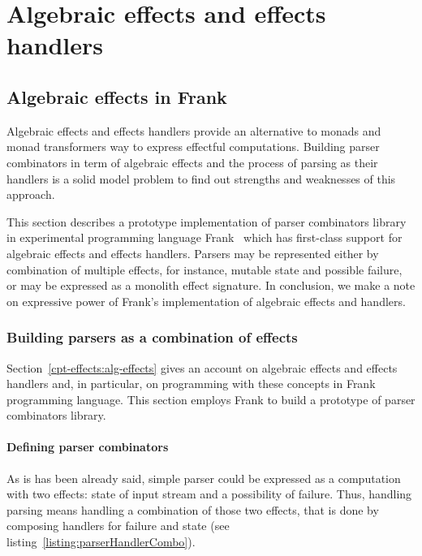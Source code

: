 \chapter{Algebraic effects and effects handlers}
\label{cpt-alg-eff}

  \section{Algebraic effects in Frank}
  \label{cpt-alg-eff:frank}

  Algebraic effects and effects handlers provide an alternative to monads and monad
  transformers way to express effectful computations. Building parser combinators in
  term of algebraic effects and the process of parsing as their handlers is a solid
  model problem to find out strengths and weaknesses of this approach.

  This section describes a prototype implementation of parser
  combinators library in experimental programming language
  Frank~\cite{DBLP:conf/popl/LindleyMM17} which has first-class support for
  algebraic effects and effects handlers. Parsers may be represented either by
  combination of multiple effects, for instance, mutable state and possible failure,
  or may be expressed as a monolith effect signature. In conclusion, we make a
  note on expressive power of Frank's implementation of algebraic effects and
  handlers.

  \subsection{Building parsers as a combination of effects}

    Section~\ref{cpt-effects:alg-effects} gives an account on algebraic effects and
    effects handlers and, in particular, on programming with these concepts in Frank
    programming language. This section employs Frank to build a prototype of parser
    combinators library.

    \subsubsection{Defining parser combinators}

    As is has been already said, simple parser could be expressed as a computation
    with two effects: state of input stream and a possibility of failure. Thus,
    handling parsing means handling a combination of those two effects, that is done
    by composing handlers for failure and state (see
    listing~\ref{listing:parserHandlerCombo}).

